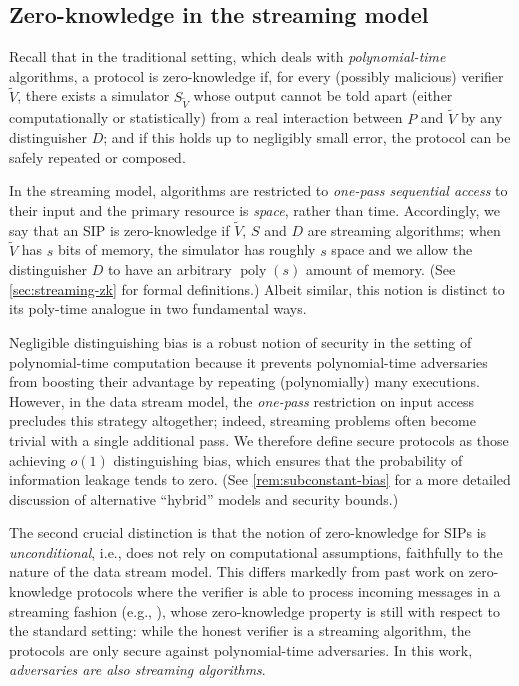 \documentclass[10pt,a4paper]{article}
\theoremstyle{definition}
\newcommand{\poly}{\operatorname{poly}}
\begin{document}
\subsection{Zero-knowledge in the streaming model}
Recall that in the traditional setting, which deals with \emph{polynomial-time} algorithms, a protocol is zero-knowledge if, for every (possibly malicious) verifier $\widetilde V$, there exists a simulator $S_{\widetilde V}$ whose output cannot be told apart (either computationally or statistically) from a real interaction between $P$ and $\widetilde V$ by any distinguisher $D$; and if this holds up to negligibly small error, the protocol can be safely repeated or composed.

In the streaming model, algorithms are restricted to \emph{one-pass sequential access} to their input and the primary resource is \emph{space}, rather than time. Accordingly, we say that an SIP is zero-knowledge if $\widetilde V$, $S$ and $D$ are streaming algorithms; when $\widetilde V$ has $s$ bits of memory, the simulator has roughly $s$ space and we allow the distinguisher $D$ to have an arbitrary $\poly(s)$ amount of memory. (See \cref{sec:streaming-zk} for formal definitions.) Albeit similar, this notion is distinct to its poly-time analogue in two fundamental ways.

Negligible distinguishing bias is a robust notion of security in the setting of polynomial-time computation because it prevents polynomial-time adversaries from boosting their advantage by repeating (polynomially) many executions. However, in the data stream model, the \emph{one-pass} restriction on input access precludes this strategy altogether; indeed, streaming problems often become trivial with a single additional pass. %
We therefore define secure protocols as those achieving $o(1)$ distinguishing bias, which ensures that the probability of information leakage tends to zero. (See \cref{rem:subconstant-bias} for a more detailed discussion of alternative ``hybrid'' models and security bounds.)

The second crucial distinction is that the notion of zero-knowledge for SIPs is \emph{unconditional}, i.e., does not rely on computational assumptions, faithfully to the nature of the data stream model. This differs markedly from past work on zero-knowledge protocols where the verifier is able to process incoming messages in a streaming fashion (e.g., \cite{GKR08,CMT12}), 
whose zero-knowledge property is still with respect to the standard setting: while the honest verifier is a streaming algorithm, the protocols are only secure against polynomial-time adversaries. In this work, \emph{adversaries are also streaming algorithms}.
\end{document}
